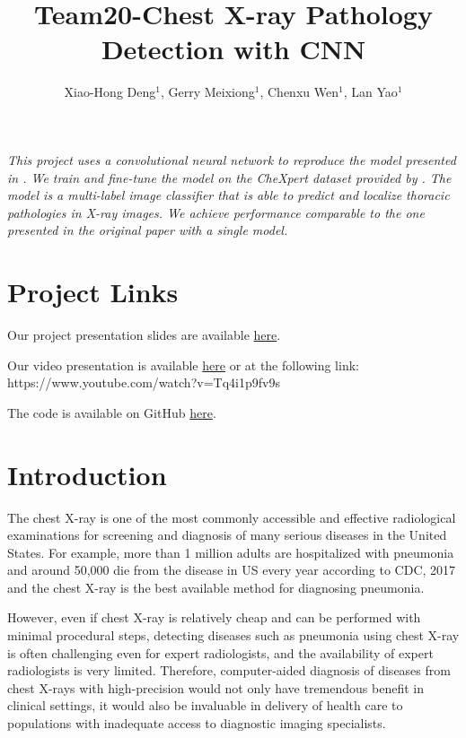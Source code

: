 \documentclass{amia}
\begin{document}
\title{Team20-Chest X-ray Pathology Detection with CNN}

\author{Xiao-Hong Deng$^{1}$, Gerry Meixiong$^{1}$, Chenxu Wen$^{1}$, Lan Yao$^{1}$}


\maketitle



\textit{This project uses a convolutional neural network to reproduce the model presented in {\color{cyan}\cite{rajpurkar}}. We train and fine-tune the model on the CheXpert dataset provided by  {\color{cyan}\cite{irvin}}. The model is a multi-label image classifier that is able to predict and localize thoracic pathologies in X-ray images. We achieve performance comparable to the one presented in the original paper with a single model.} 

\section{Project Links}

Our project presentation slides are available \href{https://docs.google.com/presentation/d/1kbBUnL0xJCGYGuFPxePkkE4tbhmbp3xkT1xigkvserI/edit}{here}.

Our video presentation is available \href{https://www.youtube.com/watch?v=Tq4i1p9fv9s}{here} or at the following link: https://www.youtube.com/watch?v=Tq4i1p9fv9s

The code is available on GitHub \href{https://github.com/Xiaohong-Deng/6250Spring2020Team20Project}{here}.

\section{Introduction}
The chest X-ray is one of the most commonly accessible and effective radiological examinations for screening and diagnosis of many serious diseases in the United States. For example, more than 1 million adults are hospitalized with pneumonia and around 50,000 die from the disease in US every year according to CDC, 2017 and the chest X-ray is the best available method for diagnosing pneumonia.

However, even if chest X-ray is relatively cheap and can be performed with minimal procedural steps, detecting diseases such as pneumonia using chest X-ray is often challenging even for expert radiologists, and the availability of expert radiologists is very limited. Therefore, computer-aided diagnosis of diseases from chest X-rays with high-precision would not only have tremendous benefit in clinical settings, it would also be invaluable in delivery of health care to populations with inadequate access to diagnostic imaging specialists.
\end{document}
